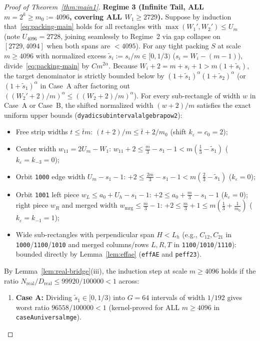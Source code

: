 \documentclass[11pt,reqno]{amsart}
\theoremstyle{plain}
\theoremstyle{definition}
\theoremstyle{remark}
\DeclareRobustCommand{\_}{\ifmmode\text{\textunderscore}\else\textunderscore\allowbreak\fi}
\begin{document}
\begin{proof}[Proof of Theorem~\ref{thm:main1}]
\medskip
\noindent\textbf{Regime 3 (Infinite Tail, ALL $m = 2^k \ge m_0 := 4096$, covering ALL $W_1 \ge 2729$).}
Suppose by induction that~\eqref{eq:packing-main} holds for all rectangles with $\max(W_1', W_2') \le U_m$ (note $U_{4096} = 2728$, joining seamlessly to Regime~2 via gap collapse on $[2729, 4094]$ when both spans are $< 4095$). For any tight packing $S$ at scale $m \ge 4096$ with normalized excess $\tilde{s}_i := s_i / m \in [0, 1/3)$ ($s_i = W_i - (m - 1)$), divide~\eqref{eq:packing-main} by $C m^{2\alpha}$. Because $W_i + 2 = m + s_i + 1 > m(1 + \tilde{s}_i)$, the target denominator is strictly bounded below by $(1 + \tilde{s}_1)^\alpha (1 + \tilde{s}_2)^\alpha$ (or $(1 + \tilde{s}_1)^\alpha$ in Case~A after factoring out $((W_2' + 2)/m)^\alpha \le ((W_2 + 2)/m)^\alpha$). For every sub-rectangle of width $w$ in Case~A or Case~B, the shifted normalized width $(w + 2)/m$ satisfies the exact uniform upper bounds (\texttt{dyadic\_subinterval\_algebra\_pow2}):
\begin{itemize}[leftmargin=1.6em]
  \item Free strip widths $t \le \bar{t} m$: $(t + 2)/m \le \bar{t} + 2/m_0$ (shift $k_\varepsilon = c_0 = 2$);
  \item Center width $w_{11} = 2 U_m - W_1$: $w_{11} + 2 \le \frac{m}{3} - s_1 - 1 < m(\frac{1}{3} - \tilde{s}_1)$ ($k_\varepsilon = k_{-3} = 0$);
  \item Orbit \texttt{1000} edge width $U_m - s_1 - 1$: $+2 \le \frac{2m}{3} - s_1 - 1 < m(\frac{2}{3} - \tilde{s}_1)$ ($k_\varepsilon = 0$);
  \item Orbit \texttt{1001} left piece $w_L \le a_0 + U_h - s_1 - 1$: $+2 \le a_0 + \frac{m}{3} - s_1 - 1$ ($k_\varepsilon = 0$); right piece $w_R$ and merged width $w_{\mathrm{mrg}} \le \frac{m}{3} - 1$: $+2 \le \frac{m}{3} + 1 \le m(\frac{1}{3} + \frac{1}{m_0})$ ($k_\varepsilon = k_{-1} = 1$);
  \item Wide sub-rectangles with perpendicular span $H < L_h$ (e.g., $C_{12}, C_{21}$ in \texttt{1000}/\texttt{1100}/\texttt{1010} and merged columns/rows $L, R, T$ in \texttt{1100}/\texttt{1010}/\texttt{1110}): bounded directly by Lemma~\ref{lem:effae} (\texttt{effAE} and \texttt{peff23}).
\end{itemize}
By Lemma~\ref{lem:real-bridge}(iii), the induction step at scale $m \ge 4096$ holds if the ratio $N_{\mathrm{real}} / D_{\mathrm{real}} \le 99920 / 100000 < 1$ across:
\begin{enumerate}[label=(\alph*),leftmargin=2em]
  \item \textbf{Case A:} Dividing $\tilde{s}_1 \in [0, 1/3)$ into $G = 64$ intervals of width $1/192$ gives worst ratio $96558/100000 < 1$ (kernel-proved for ALL $m \ge 4096$ in \texttt{caseA\_universal\_m\_ge\_4096}).

\end{enumerate}
\end{proof}
\end{document}
